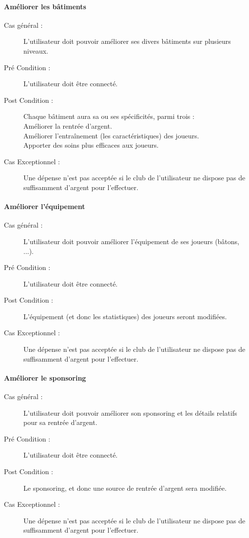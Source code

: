 \documentclass[a4paper]{article}
\begin{document}
\paragraph{Améliorer les bâtiments}
\begin{description}
\item[Cas général :] L'\gls{utilisateur} doit pouvoir améliorer ses divers bâtiments sur plusieurs niveaux. 
\item[Pré Condition  :] L'\gls{utilisateur} doit être connecté.
\item[Post Condition :] Chaque bâtiment aura sa ou ses spécificités, parmi trois :\\
Améliorer la rentrée d'argent.\\
Améliorer l'entraînement (les caractéristiques) des \glspl{joueur}.\\
Apporter des soins plus efficaces aux \glspl{joueur}.
\item[Cas Exceptionnel :] Une dépense n'est pas acceptée si le \gls{club} de l'\gls{utilisateur} ne dispose pas de suffisamment d'argent pour l'effectuer.
\end{description}
\paragraph{Améliorer l'équipement}
\begin{description}
    \item[Cas général :] L'\gls{utilisateur} doit pouvoir améliorer l'équipement de ses \glspl{joueur} (bâtons, ...).
    \item[Pré Condition  :] L'\gls{utilisateur} doit être connecté.
    \item[Post Condition :] L'équipement (et donc les statistiques) des \glspl{joueur} seront modifiées.
    \item[Cas Exceptionnel :] Une dépense n'est pas acceptée si le \gls{club} de l'\gls{utilisateur} ne dispose pas de suffisamment d'argent pour l'effectuer.
\end{description}
\paragraph{Améliorer le sponsoring}
\begin{description}
\item[Cas général :] L'\gls{utilisateur} doit pouvoir améliorer son sponsoring et les détails relatifs pour sa rentrée d'argent.
\item[Pré Condition  :] L'\gls{utilisateur} doit être connecté.
\item[Post Condition :] Le sponsoring, et donc une source de rentrée d'argent sera modifiée.
\item[Cas Exceptionnel :] Une dépense n'est pas acceptée si le \gls{club} de l'\gls{utilisateur} ne dispose pas de suffisamment d'argent pour l'effectuer.
\end{description}
\end{document}
